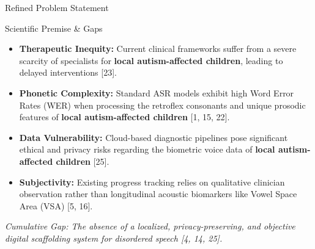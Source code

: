 \documentclass[aspectratio=169, 11pt]{beamer}
\begin{document}
\begin{frame}{Refined Problem Statement}
\begin{block}{Scientific Premise & Gaps}
\small
\begin{itemize}
\item \textbf{Therapeutic Inequity:} Current clinical frameworks suffer from a severe scarcity of specialists for \textbf{local autism-affected children}, leading to delayed interventions [23].
\item \textbf{Phonetic Complexity:} Standard ASR models exhibit high Word Error Rates (WER) when processing the retroflex consonants and unique prosodic features of \textbf{local autism-affected children} [1, 15, 22].
\item \textbf{Data Vulnerability:} Cloud-based diagnostic pipelines pose significant ethical and privacy risks regarding the biometric voice data of \textbf{local autism-affected children} [25].
\item \textbf{Subjectivity:} Existing progress tracking relies on qualitative clinician observation rather than longitudinal acoustic biomarkers like Vowel Space Area (VSA) [5, 16].
\end{itemize}
\end{block}
\vspace{2mm}
\centering
\footnotesize \textit{Cumulative Gap: The absence of a localized, privacy-preserving, and objective digital scaffolding system for disordered speech [4, 14, 25].}
\end{frame}
\end{document}
